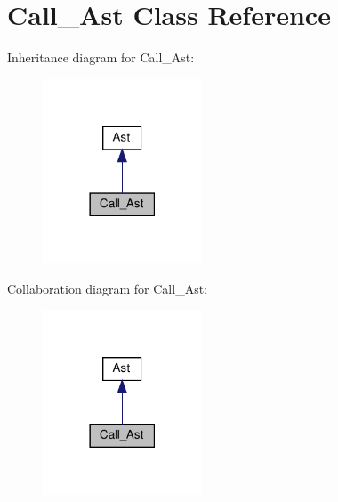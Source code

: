 \hypertarget{classCall__Ast}{}\section{Call\+\_\+\+Ast Class Reference}
\label{classCall__Ast}


Inheritance diagram for Call\+\_\+\+Ast\+:
\nopagebreak
\begin{figure}[H]
\begin{center}
\leavevmode
\includegraphics[width=134pt]{classCall__Ast__inherit__graph}
\end{center}
\end{figure}


Collaboration diagram for Call\+\_\+\+Ast\+:
\nopagebreak
\begin{figure}[H]
\begin{center}
\leavevmode
\includegraphics[width=134pt]{classCall__Ast__coll__graph}
\end{center}
\end{figure}
